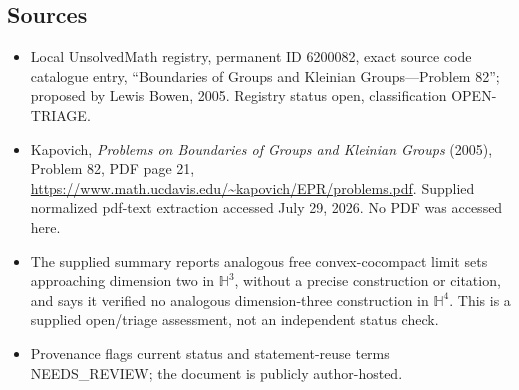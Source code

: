 \documentclass[11pt]{article}
\begin{document}
\subsection{Sources}
\begin{itemize}
\item Local UnsolvedMath registry, permanent ID 6200082, exact source code catalogue entry, ``Boundaries of Groups and Kleinian Groups---Problem 82''; proposed by Lewis Bowen, 2005. Registry status open, classification OPEN-TRIAGE.
\item Kapovich, \emph{Problems on Boundaries of Groups and Kleinian Groups} (2005), Problem 82, PDF page 21, \url{https://www.math.ucdavis.edu/~kapovich/EPR/problems.pdf}. Supplied normalized pdf-text extraction accessed July 29, 2026. No PDF was accessed here.
\item The supplied summary reports analogous free convex-cocompact limit sets approaching dimension two in $\mathbb H^3$, without a precise construction or citation, and says it verified no analogous dimension-three construction in $\mathbb H^4$. This is a supplied open/triage assessment, not an independent status check.
\item Provenance flags current status and statement-reuse terms NEEDS\_REVIEW; the document is publicly author-hosted.
\end{itemize}
\end{document}
